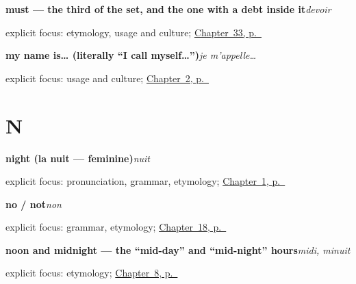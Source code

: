 \noindent\begin{minipage}[t]{\linewidth}
\raggedright
\textbf{must — the third of the set, and the one with a debt inside it}\enspace\emph{devoir}\par
\footnotesize explicit focus: etymology, usage and culture; \hyperref[ch:fr-modaux]{Chapter~33, p.~\pageref*{ch:fr-modaux}}
\end{minipage}\par\smallskip

\noindent\begin{minipage}[t]{\linewidth}
\raggedright
\textbf{my name is… (literally \textquotedblleft{}I call myself…\textquotedblright{})}\enspace\emph{je m'appelle…}\par
\footnotesize explicit focus: usage and culture; \hyperref[ch:introductions]{Chapter~2, p.~\pageref*{ch:introductions}}
\end{minipage}\par\smallskip

\section*{N}

\noindent\begin{minipage}[t]{\linewidth}
\raggedright
\textbf{night (la nuit — feminine)}\enspace\emph{nuit}\par
\footnotesize explicit focus: pronunciation, grammar, etymology; \hyperref[ch:greetings]{Chapter~1, p.~\pageref*{ch:greetings}}
\end{minipage}\par\smallskip

\noindent\begin{minipage}[t]{\linewidth}
\raggedright
\textbf{no / not}\enspace\emph{non}\par
\footnotesize explicit focus: grammar, etymology; \hyperref[ch:fr-yes-and-no]{Chapter~18, p.~\pageref*{ch:fr-yes-and-no}}
\end{minipage}\par\smallskip

\noindent\begin{minipage}[t]{\linewidth}
\raggedright
\textbf{noon and midnight — the \textquotedblleft{}mid-day\textquotedblright{} and \textquotedblleft{}mid-night\textquotedblright{} hours}\enspace\emph{midi, minuit}\par
\footnotesize explicit focus: etymology; \hyperref[ch:time]{Chapter~8, p.~\pageref*{ch:time}}
\end{minipage}\par\smallskip

